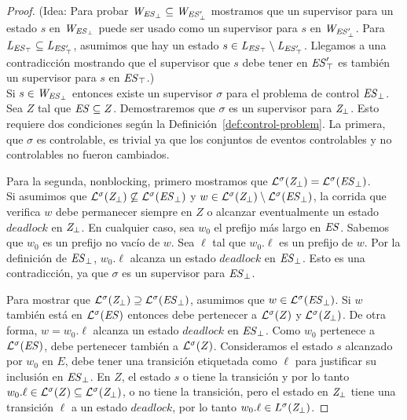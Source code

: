 \begin{proof}
	
(Idea:	Para probar $\mathit{W_{\mathit{\mathit{ES}_{\bot}}}} \subseteq \mathit{W_{\mathit{\mathit{ES}'_{\bot}}}}$ mostramos que un supervisor para un estado $s$ en $\mathit{W_{\mathit{\mathit{ES}_{\bot}}}}$ 
	puede ser usado como un supervisor para $s$ en $\mathit{W_{\mathit{\mathit{ES}'_{\bot}}}}$. Para $\mathit{L_{\mathit{\mathit{ES}_{\top}}}} \subseteq 
	\mathit{L_{\mathit{\mathit{ES}'_{\top}}}}$, asumimos que hay un estado $s \in \mathit{L_{\mathit{\mathit{ES}_{\top}}}} \setminus \mathit{L_{\mathit{\mathit{ES}'_{\top}}}} $. Llegamos a una contradicción mostrando que el supervisor que $s$ debe tener en
	$\mathit{\mathit{ES}'_{\top}}$ es también un supervisor para $s$ en $\mathit{\mathit{ES}_{\top}}$.)\\
	

Si $s \in \mathit{W_{\mathit{\mathit{ES}_{\bot}}}} $ entonces existe un supervisor $\sigma$ para el problema de control $\mathit{\mathit{ES}_{\bot}}$. Sea $Z$ tal que $\mathit{ES} \subseteq Z$. Demostraremos que $\sigma$ es un supervisor para $\mathit{Z_{\bot}}$. Esto requiere dos condiciones según la Definición~\ref{def:control-problem}. La primera, que $\sigma$ es controlable, es trivial ya que los conjuntos de eventos controlables y no controlables no fueron cambiados. 

Para la segunda, nonblocking, primero mostramos que $\mathcal{L}^\sigma(\mathit{Z_{\bot}}) = 
\mathcal{L}^\sigma(\mathit{\mathit{ES}_{\bot}})$. \\

Si asumimos que $\mathcal{L}^\sigma(\mathit{Z_{\bot}}) \not\subseteq \mathcal{L}^\sigma(\mathit{\mathit{ES}_{\bot}})$ y $w \in 
\mathcal{L}^\sigma(\mathit{Z_{\bot}}) \setminus \mathcal{L}^\sigma(\mathit{\mathit{ES}_{\bot}})$, la corrida que verifica $w$ debe permanecer siempre en $Z$ o alcanzar eventualmente un estado $deadlock$ en $\mathit{Z_{\bot}}$. En cualquier caso, sea $w_0$ el prefijo más largo en $\mathit{ES}$. 
Sabemos que $w_0$ es un prefijo no vacío de $w$. Sea $\ell$ tal que $w_0.\ell$ es un prefijo de $w$. 
Por la definición de $\mathit{\mathit{ES}_{\bot}}$, $w_0.\ell$ alcanza un estado $deadlock$ en $\mathit{\mathit{ES}_{\bot}}$. Esto es una contradicción, ya que $\sigma$ es un supervisor para
$\mathit{\mathit{ES}_{\bot}}$. 

Para mostrar que $\mathcal{L}^\sigma(\mathit{Z_{\bot}}) \supseteq \mathcal{L}^\sigma(\mathit{\mathit{ES}_{\bot}})$, asumimos que $w \in \mathcal{L}^\sigma(\mathit{\mathit{ES}_{\bot}})$. Si $w$ también está en $\mathcal{L}^\sigma(\mathit{ES})$ entonces debe pertenecer a $\mathcal{L}^\sigma(Z)$ y $\mathcal{L}^\sigma(\mathit{Z_{\bot}})$. De otra forma, $w = w_0.\ell$ alcanza un estado $deadlock$ en $\mathit{\mathit{ES}_{\bot}}$. Como $w_0$ pertenece a $\mathcal{L}^\sigma(\mathit{ES})$, debe pertenecer también a $\mathcal{L}^\sigma(Z)$. Consideramos el estado $s$ alcanzado por  $w_0$ en $E$, debe tener una transición etiquetada como $\ell$ para justificar su inclusión en $\mathit{\mathit{ES}_{\bot}}$. En $Z$, el estado $s$ o tiene la transición y por lo tanto $w_0.\ell \in \mathcal{L}^\sigma(Z) \subseteq 
\mathcal{L}^\sigma(\mathit{Z_{\bot}})$, o no tiene la transición, pero el estado en $\mathit{Z_{\bot}}$ tiene una transición $\ell$ a un estado $deadlock$, por lo tanto $w_0.\ell \in 
L^\sigma(\mathit{Z_{\bot}})$.


\end{proof}
